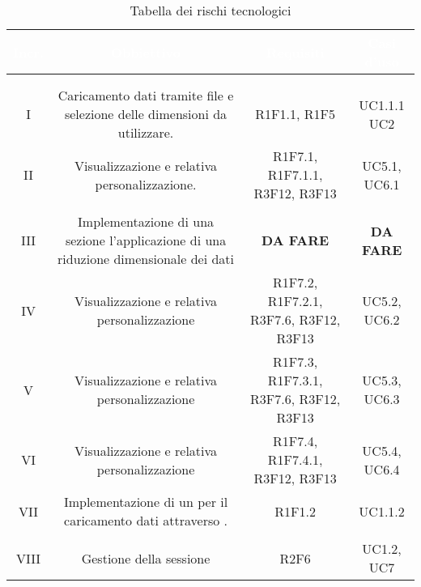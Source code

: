 \setlength\colA{1.5cm}
\setlength\colB{8cm}
\setlength\colC{4cm}
\setlength\colD{2cm}
\setlength\total{\dimexpr\colA+\colB+\colC+\colD+6\tabcolsep\relax}
\begin{longtable}{C{\colA} C{\colB} C{\colC} C{\colD}}
		\textcolor{white}{\textbf{Incr.}} & 
		\textcolor{white}{\textbf{Obbiettivo}} & 
		\textcolor{white}{\textbf{Requisiti}} & 
		\textcolor{white}{\textbf{Casi d'uso}} \\
		\endfirsthead
	    \\
	    \endfoot
	    \caption{Tabella dei rischi tecnologici}
	    \endlastfoot


\\
I &
Caricamento dati tramite file e selezione delle dimensioni da utilizzare.& 
R1F1.1, R1F5 & 
UC1.1.1 \newline UC2\\
II &
Visualizzazione  e relativa personalizzazione.& 
R1F7.1, R1F7.1.1, R3F12, R3F13 & 
UC5.1, UC6.1\\
\\
III & 
Implementazione di una sezione l'applicazione di una riduzione dimensionale dei dati & 
\textbf{DA FARE}& 
\textbf{DA FARE}\\
IV & 
Visualizzazione  e relativa personalizzazione & 
R1F7.2, R1F7.2.1, R3F7.6, R3F12, R3F13 & 
UC5.2, UC6.2\\
V & 
Visualizzazione  e relativa personalizzazione & 
R1F7.3, R1F7.3.1, R3F7.6, R3F12, R3F13& 
UC5.3, UC6.3\\
VI & 
Visualizzazione  e relativa personalizzazione & 
R1F7.4, R1F7.4.1, R3F12, R3F13& 
UC5.4, UC6.4\\
VII & 
Implementazione di un  per il caricamento dati attraverso . & 
R1F1.2 & 
UC1.1.2\\

\\
VIII & 
Gestione della sessione & 
R2F6 & 
UC1.2, UC7\\


\end{longtable}
